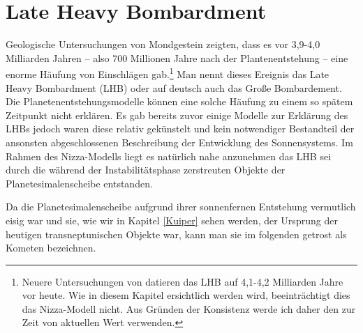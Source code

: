 \documentclass[12pt,a4paper,twoside]{article}
\renewcommand{\cite}{\citep}
\begin{document}
\section{Late Heavy Bombardment}\label{LHB}
Geologische Untersuchungen von Mondgestein zeigten, dass es vor 3,9-4,0 Milliarden Jahren -- also 700 Millionen Jahre nach der Plantenentstehung --
eine enorme Häufung von Einschlägen gab.\footnote{Neuere Untersuchungen von \cite{Bottke2012} datieren das LHB auf 4,1-4,2 Milliarden Jahre vor heute. Wie in diesem Kapitel ersichtlich werden wird, beeinträchtigt dies das Nizza-Modell nicht. Aus Gründen der Konsistenz werde ich daher den zur Zeit von \cite{Gomes2005} aktuellen Wert verwenden.} Man nennt dieses Ereignis das Late Heavy Bombardment (LHB) oder auf deutsch auch das Große Bombardement\cite{Tera1974,Hartmann2000,Ryder2002}.
Die Planetenentstehungsmodelle können eine solche Häufung zu einem so spätem Zeitpunkt nicht erklären.
Es gab bereits zuvor einige Modelle zur Erklärung des LHBs \citep[insb.][]{Zappal1998Icar,Levison2001Icar,Chambers2002LPI,Levison2004ASPC} jedoch waren diese relativ gekünstelt und kein notwendiger Bestandteil der ansonsten abgeschlossenen Beschreibung der Entwicklung des Sonnensystems\cite{Gomes2005}.
Im Rahmen des Nizza-Modells liegt es natürlich nahe anzunehmen das LHB sei durch die während der Instabilitätsphase zerstreuten Objekte der Planetesimalenscheibe entstanden.

Da die Planetesimalenscheibe aufgrund ihrer sonnenfernen Entstehung vermutlich eisig war und sie, wie wir in Kapitel \ref{Kuiper} sehen werden, der Ursprung der heutigen transneptunischen Objekte war, kann man sie im folgenden getrost als Kometen bezeichnen\cite{Gomes2005}. %
\end{document}
